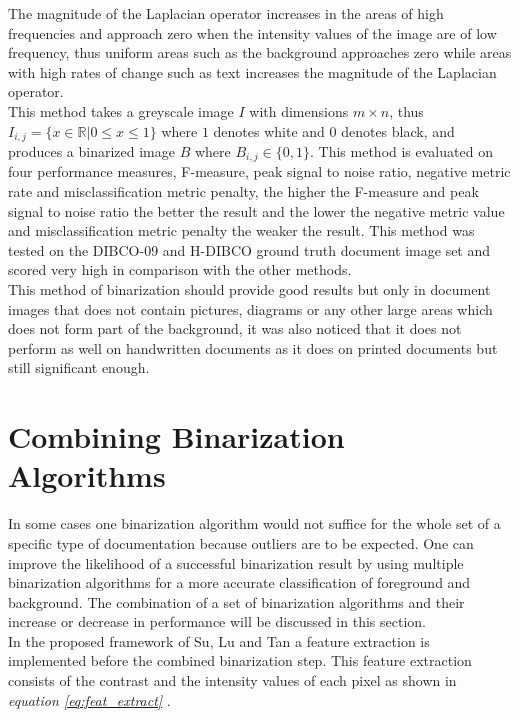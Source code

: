 \documentclass[11pt]{article}
\begin{document}
  			The magnitude of the Laplacian operator increases in the areas of high frequencies and approach zero when the intensity values of the image are of low frequency, thus uniform areas such as the background approaches zero while areas with high rates of change such as text increases the magnitude of the Laplacian operator\cite{howe2011laplacian}.\\

  			This method takes a greyscale image $I$ with dimensions $m\times n$, thus $I_{i,j} = \{x \in \mathbb{R}|0 \leq x \leq 1\}$ where $1$ denotes white and $0$ denotes black, and produces a binarized image $B$ where $B_{i,j} \in\{0,1\}$. This method is evaluated on four performance measures, F-measure, peak signal to noise ratio, negative metric rate and misclassification metric penalty, the higher the F-measure and peak signal to noise ratio the better the result and the lower the negative metric value and misclassification metric penalty the weaker the result. This method was tested on the DIBCO-09 and H-DIBCO ground truth document image set and scored very high in comparison with the other methods\cite{howe2011laplacian}.\\

  			This method of binarization should provide good results but only in document images that does not contain pictures, diagrams or any other large areas which does not form part of the background, it was also noticed that it does not perform as well on handwritten documents as it does on printed documents but still significant enough.

        \section{Combining Binarization Algorithms}
      		In some cases one binarization algorithm would not suffice for the whole set of a specific type of documentation because outliers are to be expected. One can improve the likelihood of a successful binarization result by using multiple binarization algorithms for a more accurate classification of foreground and background. The combination of a set of binarization algorithms and their increase or decrease in performance will be discussed in this section.\\

      		In the proposed framework of Su, Lu and Tan \cite{su2011combination} a feature extraction is implemented before the combined binarization step. This feature extraction consists of the contrast and the intensity values of each pixel as shown in \textit{equation \ref{eq:feat_extract}} \cite{su2011combination}.
\end{document}

